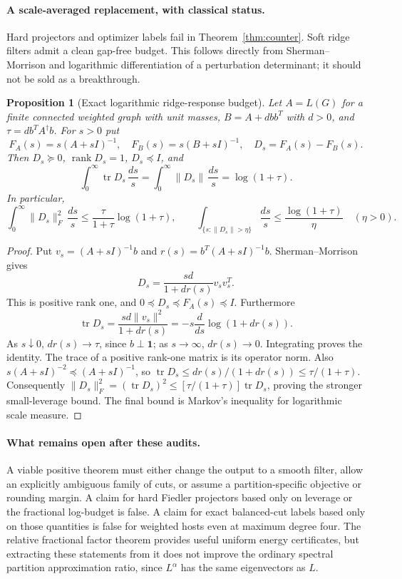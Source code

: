 \documentclass[11pt]{article}
\newtheorem{proposition}[theorem]{Proposition}
\newcommand{\one}{\boldsymbol 1}
\newcommand{\tr}{\operatorname{tr}}
\begin{document}
\paragraph{A scale-averaged replacement, with classical status.}
Hard projectors and optimizer labels fail in Theorem~\ref{thm:counter}.
Soft ridge filters admit a clean gap-free budget. This follows
directly from Sherman--Morrison and logarithmic differentiation of
a perturbation determinant; it should not be sold as a breakthrough.

\begin{proposition}[Exact logarithmic ridge-response budget]
\label{prop:ridge}
Let $A=L(G)$ for a finite connected weighted graph with unit masses,
$B=A+dbb^T$ with $d>0$, and $\tau=db^TA^\dagger b$. For $s>0$ put
\[
 F_A(s)=s(A+sI)^{-1},\quad F_B(s)=s(B+sI)^{-1},\quad
 D_s=F_A(s)-F_B(s).
\]
Then $D_s\succeq0$, $\operatorname{rank}D_s=1$, $D_s\preceq I$, and
\[
 \int_0^\infty\tr D_s\,\frac{ds}{s}
 =\int_0^\infty\|D_s\|\,\frac{ds}{s}
 =\log(1+\tau).
\]
In particular,
\[
 \int_0^\infty\|D_s\|_F^2\,\frac{ds}{s}
 \le\frac{\tau}{1+\tau}\log(1+\tau),
\qquad
 \int_{\{s:\|D_s\|>\eta\}}\frac{ds}{s}
 \le\frac{\log(1+\tau)}\eta\quad(\eta>0).
\]
\end{proposition}
\begin{proof}
Put $v_s=(A+sI)^{-1}b$ and $r(s)=b^T(A+sI)^{-1}b$.
Sherman--Morrison gives
\[
 D_s=\frac{sd}{1+dr(s)}v_sv_s^T.
\]
This is positive rank one, and $0\preceq D_s\preceq F_A(s)\preceq I$.
Furthermore
\[
 \tr D_s=\frac{sd\|v_s\|^2}{1+dr(s)}
        =-s\frac{d}{ds}\log(1+dr(s)).
\]
As $s\downarrow0$, $dr(s)\to\tau$, since $b\perp\one$;
as $s\to\infty$, $dr(s)\to0$. Integrating proves the identity.
The trace of a positive rank-one matrix is its operator norm. Also
$s(A+sI)^{-2}\preceq(A+sI)^{-1}$, so
$\tr D_s\le dr(s)/(1+dr(s))\le\tau/(1+\tau)$.
Consequently $\|D_s\|_F^2=(\tr D_s)^2
\le[\tau/(1+\tau)]\tr D_s$, proving the stronger small-leverage bound.
The final bound is Markov's inequality for logarithmic scale measure.
\end{proof}

\paragraph{What remains open after these audits.}
A viable positive theorem must either change the output to a smooth
filter, allow an explicitly ambiguous family of cuts, or assume a
partition-specific objective or rounding margin. A claim for hard
Fiedler projectors based only on leverage or the fractional log-budget
is false. A claim for exact balanced-cut labels based only on those
quantities is false for weighted hosts even at maximum degree four.
The relative fractional factor theorem provides useful uniform energy
certificates, but extracting these statements from it does not improve
the ordinary spectral partition approximation ratio, since
$L^\alpha$ has the same eigenvectors as $L$.
\end{document}

